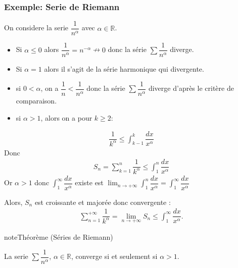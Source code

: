 \documentclass[letterpaper,10pt,french]{sphinxmanual}
\begin{document}
\subsubsection{Exemple: Serie de Riemann}
\label{\detokenize{series:exemple-serie-de-riemann}}
\sphinxAtStartPar
On considere la serie \(\dfrac{1}{n^\alpha}\) avec \(\alpha \in \mathbb R\).
\begin{itemize}
\item {} 
\sphinxAtStartPar
Si \(\alpha \leq 0\) alors \(\dfrac{1}{n^\alpha}= n^{-\alpha} \nrightarrow  0\) donc la série \(\sum \dfrac{1}{n^\alpha}\) diverge.

\item {} 
\sphinxAtStartPar
Si \(\alpha =1\) alors il s’agit de la série harmonique qui divergente.

\item {} 
\sphinxAtStartPar
si \(0 < \alpha\),  on a \(\dfrac{1}{n}<\dfrac{1}{n^\alpha}\) donc la série \(\sum \dfrac{1}{n^\alpha}\) diverge d’après le critère de comparaison.

\item {} 
\sphinxAtStartPar
si \(\alpha > 1\), alors on a pour \(k\geq 2\):

\end{itemize}
\begin{equation*}
\begin{split}
\dfrac{1}{k^\alpha} \leq \int_{k-1}^{k} \dfrac{dx}{x^\alpha}
\end{split}
\end{equation*}
\sphinxAtStartPar
Donc
\begin{equation*}
\begin{split}
S_n= \sum_{k=1}^{n} \dfrac{1}{k^\alpha} \leq \int_1^n \dfrac{dx}{x^\alpha}
\end{split}
\end{equation*}
\sphinxAtStartPar
Or \(\alpha > 1\) donc \(\int_1^\infty \dfrac{dx}{x^\alpha}\) existe est \(\lim_{n \to +\infty} \int_1^n \dfrac{dx}{x^\alpha}= \int_1^\infty \dfrac{dx}{x^\alpha}\)

\sphinxAtStartPar
Alors, \(S_n\) est croissante et majorée donc convergente :
\begin{equation*}
\begin{split}
\sum_{n=1}^{+\infty} \dfrac{1}{k^\alpha} = \lim_{n \to +\infty} S_n \leq \int_1^\infty \dfrac{dx}{x^\alpha}.
\end{split}
\end{equation*}
\begin{sphinxadmonition}{note}{Théorème (Séries de Riemann)}

\sphinxAtStartPar
La serie \(\sum \dfrac{1}{n^\alpha}\), \(\alpha \in \mathbb R\), converge si et seulement si \(\alpha >1\).
\end{sphinxadmonition}
\end{document}
